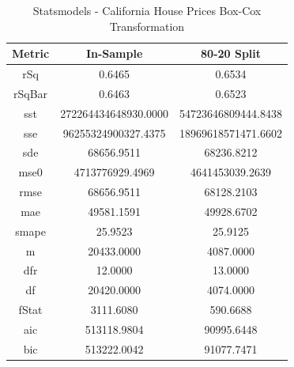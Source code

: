 \documentclass{article}
\begin{document}
\begin{table}[H]
\centering
\caption{Statsmodels - California House Prices Box-Cox Transformation}
\label{tab:Statsmodels - House Prices Box-Cox Transformation}
\begin{tabular}{|c|c|c|}\hline
Metric & In-Sample & 80-20 Split \\ \hline \hline
rSq & 0.6465 & 0.6534 \\ \hline
rSqBar & 0.6463 & 0.6523 \\ \hline
sst & 272264434648930.0000 & 54723646809444.8438 \\ \hline
sse & 96255324900327.4375 & 18969618571471.6602 \\ \hline
sde & 68656.9511 & 68236.8212 \\ \hline
mse0 & 4713776929.4969 & 4641453039.2639 \\ \hline
rmse & 68656.9511 & 68128.2103 \\ \hline
mae & 49581.1591 & 49928.6702 \\ \hline
smape & 25.9523 & 25.9125 \\ \hline
m & 20433.0000 & 4087.0000 \\ \hline
dfr & 12.0000 & 13.0000 \\ \hline
df & 20420.0000 & 4074.0000 \\ \hline
fStat & 3111.6080 & 590.6688 \\ \hline
aic & 513118.9804 & 90995.6448 \\ \hline
bic & 513222.0042 & 91077.7471 \\ \hline
\end{tabular}
\end{table}
\end{document}
